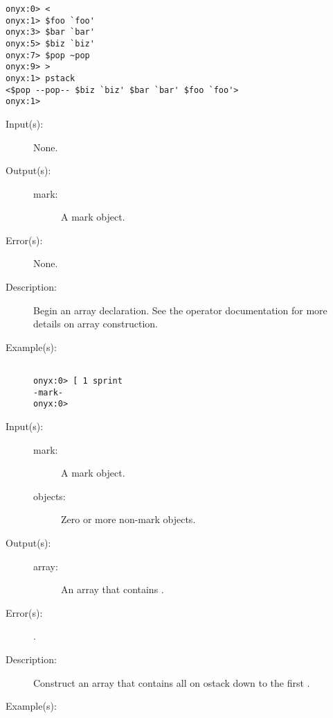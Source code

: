 \begin{description}
\begin{description}
\begin{verbatim}
onyx:0> <
onyx:1> $foo `foo'
onyx:3> $bar `bar'
onyx:5> $biz `biz'
onyx:7> $pop ~pop
onyx:9> >
onyx:1> pstack
<$pop --pop-- $biz `biz' $bar `bar' $foo `foo'>
onyx:1>
		\end{verbatim}
	\end{description}
\label{systemdict:sym_lb}
\index{[@\onyxop{}{{\lb}}{}}
\item[{\onyxop{--}{{\lb}}{mark}}: ]
	\begin{description}\item[]
	\item[Input(s): ] None.
	\item[Output(s): ]
		\begin{description}\item[]
		\item[mark: ]
			A mark object.
		\end{description}
	\item[Error(s): ] None.
	\item[Description: ]
		Begin an array declaration.  See the
		\htmlref{\onyxop{}{]}{}}{systemdict:sym_rb} operator
		documentation for more details on array construction.
	\item[Example(s): ]\begin{verbatim}

onyx:0> [ 1 sprint
-mark-
onyx:0>
		\end{verbatim}
	\end{description}
\label{systemdict:sym_rb}
\index{]@\onyxop{}{{\rb}}{}}
\item[{\onyxop{mark objects}{{\rb}}{array}}: ]
	\begin{description}\item[]
	\item[Input(s): ]
		\begin{description}\item[]
		\item[mark: ]
			A mark object.
		\item[objects: ]
			Zero or more non-mark objects.
		\end{description}
	\item[Output(s): ]
		\begin{description}\item[]
		\item[array: ]
			An array that contains .
		\end{description}
	\item[Error(s): ]
		\begin{description}\item[]
		\item[.]
		\end{description}
	\item[Description: ]
		Construct an array that contains all  on ostack
		down to the first .
	\item[Example(s): ]\begin{verbatim}


\end{verbatim}
\end{description}
\end{description}
